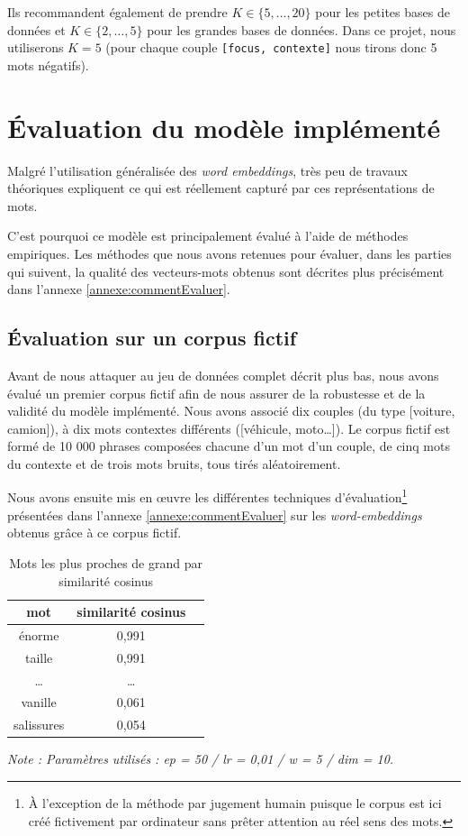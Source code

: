 \documentclass[11pt,french,french]{article}
\let\rmarkdownfootnote\footnote%
\def\footnote{\protect\rmarkdownfootnote}
\begin{document}
Ils recommandent également de prendre \(K\in\{5,\dots,20\}\) pour les
petites bases de données et \(K\in\{2,\dots,5\}\) pour les grandes bases
de données. Dans ce projet, nous utiliserons \(K=5\) (pour chaque couple
\texttt{{[}focus,\ contexte{]}} nous tirons donc 5 mots négatifs).

\section{Évaluation du modèle implémenté}\label{sec:evaluation}

Malgré l'utilisation généralisée des \emph{word embeddings}, très peu de
travaux théoriques expliquent ce qui est réellement capturé par ces
représentations de mots.

C'est pourquoi ce modèle est principalement évalué à l'aide de méthodes
empiriques. Les méthodes que nous avons retenues pour évaluer, dans les
parties qui suivent, la qualité des vecteurs-mots obtenus sont décrites
plus précisément dans l'annexe \ref{annexe:commentEvaluer}.

\subsection{Évaluation sur un corpus fictif}\label{sec:corpusFictif}

Avant de nous attaquer au jeu de données complet décrit plus bas, nous
avons évalué un premier corpus fictif afin de nous assurer de la
robustesse et de la validité du modèle implémenté. Nous avons associé
dix couples (du type {[}voiture, camion{]}), à dix mots contextes
différents ({[}véhicule, moto\dots{]}). Le corpus fictif est formé de 10
000 phrases composées chacune d'un mot d'un couple, de cinq mots du
contexte et de trois mots bruits, tous tirés aléatoirement.

Nous avons ensuite mis en œuvre les différentes techniques
d'évaluation\footnote{À l'exception de la méthode par \og jugement
  humain \fg{} puisque le corpus est ici créé fictivement par ordinateur
  sans prêter attention au réel sens des mots.} présentées dans l'annexe
\ref{annexe:commentEvaluer} sur les \emph{word-embeddings} obtenus grâce
à ce corpus fictif.

\begin{table}
\begin{center}
\begin{tabular}{|c|c|c|}
    \hline
    mot & similarité cosinus \tabularnewline
    \hline
    énorme & 0,991   \tabularnewline
    taille & 0,991   \tabularnewline
    \dots & \dots    \tabularnewline
    vanille & 0,061   \tabularnewline
    salissures & 0,054   \tabularnewline
    \hline
 \end{tabular}
\captionsetup{margin=0cm,format=hang,justification=justified}
\caption{Mots les plus proches de \og grand \fg{} par similarité cosinus}\label{table:tableau_evaluation}
\end{center}
\vspace{-0.3cm}
\footnotesize
\emph{Note : Paramètres utilisés : ep = 50 / lr = 0,01 / w = 5 / dim = 10.}
\end{table}
\end{document}
